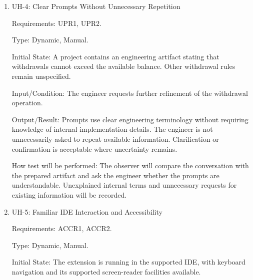 \documentclass[12pt, titlepage]{article}
\begin{document}
\begin{enumerate}
Type: Dynamic, Manual.

Initial State: A project contains verified links between requirements or
contracts, implementation code, and tests.

Input/Condition: The engineer is asked to locate the implementation associated
with a requirement, then the engineering intent associated with an
implementation artifact.

Output/Result: The engineer can find the information and understand the
displayed relationships without being shown which controls to use.

How test will be performed: The observer will record navigation difficulties,
assistance needed, and confusing relationship displays. Link correctness is
established beforehand and tested separately by functional tests; this case
assesses how easily the information can be found and understood.

\item{UH-4: Clear Prompts Without Unnecessary Repetition\\}

Requirements: UPR1, UPR2.

Type: Dynamic, Manual.

Initial State: A project contains an engineering artifact stating that
withdrawals cannot exceed the available balance. Other withdrawal rules remain
unspecified.

Input/Condition: The engineer requests further refinement of the withdrawal
operation.

Output/Result: Prompts use clear engineering terminology without requiring
knowledge of internal implementation details. The engineer is not
unnecessarily asked to repeat available information. Clarification or
confirmation is acceptable where uncertainty remains.

How test will be performed: The observer will compare the conversation with
the prepared artifact and ask the engineer whether the prompts are
understandable. Unexplained internal terms and unnecessary requests for
existing information will be recorded.

\item{UH-5: Familiar IDE Interaction and Accessibility\\}

Requirements: ACCR1, ACCR2.

Type: Dynamic, Manual.

Initial State: The extension is running in the supported IDE, with keyboard
navigation and its supported screen-reader facilities available.


\end{enumerate}
\end{document}
